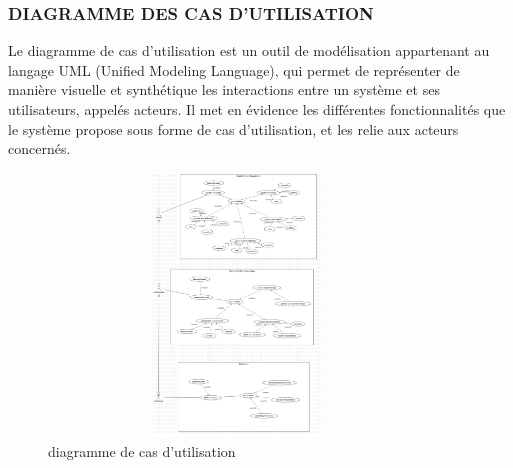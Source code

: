\documentclass[english,12pt,a4paper]{report}
\begin{document}
\subsubsection{DIAGRAMME DES CAS D'UTILISATION}
Le diagramme de cas d'utilisation est un outil de modélisation appartenant au langage UML (Unified Modeling Language), qui permet de représenter de manière visuelle et synthétique les interactions entre un système et ses utilisateurs, appelés acteurs. Il met en évidence les différentes fonctionnalités que le système propose sous forme de cas d'utilisation, et les relie aux acteurs concernés. 
\begin{figure}[h]
	\centering
	\includegraphics[width=10cm, height=7cm]{UseCaseDiagram1.jpg}
	\caption{diagramme de cas d'utilisation}
	\label{fig3: diagramme de cas d'utilisation}
\end{figure} \par \par
\end{document}
